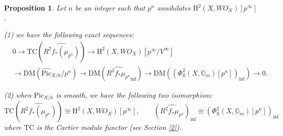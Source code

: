 \documentclass[a4paper,12pt,twoside]{report}
\newtheorem{proposition}[theorem]{Proposition}
\newcommand{\G}{\mathbb{G}}
\newcommand{\Pic}{\mathrm{Pic}}
\newcommand{\HH}{\mathrm{H}}
\newcommand{\TC}{\mathrm{TC}}
\newcommand{\DM}{\mathrm{DM}}
\newcommand{\fl}{\mathrm{fl}}
\begin{document}
\begin{proposition}
    Let $n$ be an integer such that $p^n$ annihilates
$\HH^2(X,WO_X)[p^\infty]$. 

{\rm (1)} we have the following exact sequences: 
\begin{equation*}
    \begin{aligned}
    &0 \rightarrow \TC(\widehat{R^2f_*(\mu_{p^n})}) \rightarrow \HH^2(X,WO_{X})[p^{\infty}/V^\infty]\\
    & \rightarrow \DM(\widehat{\Pic}_{X/k}/p^n) \rightarrow \DM(\widehat{R^2f_*\mu_{p^n}}_{\inf}) \rightarrow \DM((\Phi^2_{\fl}(X,\G_m)[p^n])_{\inf}) \rightarrow 0.
    \end{aligned}
\end{equation*}

{\rm (2)} when $\Pic_{X/k}$ is smooth, we have the following two isomorphism:
\[  \TC(\widehat{R^2f_*(\mu_{p^n})}) \cong \HH^2(X,WO_{X})[p^{\infty}],\qquad (\widehat{R^2f_*\mu_{p^n}})_{\inf}\cong (\Phi^2_{\fl}(X,\G_m)[p^n])_{\inf}\]
where $\TC$ is the Cartier module functor (see Section \ref{2}).
\end{proposition}
\end{document}
